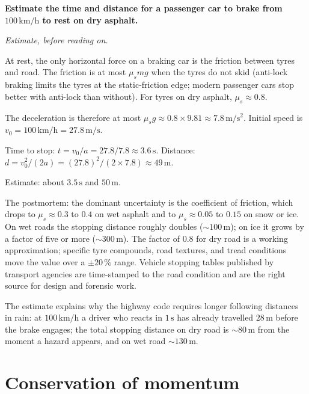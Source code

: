 \begin{estimation}
\textbf{Estimate the time and distance for a passenger car to brake
from $100\,\si{\kilo\meter\per\hour}$ to rest on dry asphalt.}

\smallskip
\textit{Estimate, before reading on.}

\smallskip
At rest, the only horizontal force on a braking car is the friction
between tyres and road. The friction is at most $\mu_s m g$ when the
tyres do not skid (anti-lock braking limits the tyres at the
static-friction edge; modern passenger cars stop better with anti-lock
than without). For tyres on dry asphalt, $\mu_s \approx 0.8$.

The deceleration is therefore at most $\mu_s g \approx 0.8 \times
9.81 \approx 7.8\,\si{\meter\per\second\squared}$. Initial speed is
$v_0 = 100\,\si{\kilo\meter\per\hour} = 27.8\,\si{\meter\per\second}$.

Time to stop: $t = v_0 / a = 27.8 / 7.8 \approx 3.6\,\si{\second}$.
Distance: $d = v_0^2 / (2a) = (27.8)^2 / (2 \times 7.8) \approx
49\,\si{\meter}$.

Estimate: about $3.5\,\si{\second}$ and $50\,\si{\meter}$.

The postmortem: the dominant uncertainty is the coefficient of
friction, which drops to $\mu_s \approx 0.3$ to $0.4$ on wet asphalt
and to $\mu_s \approx 0.05$ to $0.15$ on snow or ice. On wet roads
the stopping distance roughly doubles ($\sim 100\,\si{\meter}$); on
ice it grows by a factor of five or more ($\sim 300\,\si{\meter}$).
The factor of $0.8$ for dry road is a working approximation;
specific tyre compounds, road textures, and tread conditions move
the value over a $\pm 20\,\%$ range. Vehicle stopping tables
published by transport agencies are time-stamped to the road
condition and are the right source for design and forensic work.

The estimate explains why the highway code requires longer following
distances in rain: at $100\,\si{\kilo\meter\per\hour}$ a driver who
reacts in $1\,\si{\second}$ has already travelled $28\,\si{\meter}$
before the brake engages; the total stopping distance on dry road is
$\sim 80\,\si{\meter}$ from the moment a hazard appears, and on wet
road $\sim 130\,\si{\meter}$.
\end{estimation}

\section{Conservation of momentum}

